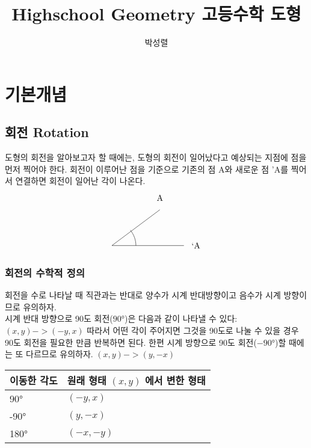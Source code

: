 \documentclass{article}
\title{Highschool Geometry 고등수학 도형}
\author{박성렬}
\begin{document}
\maketitle
\section{기본개념}
\subsection{회전 Rotation}
도형의 회전을 알아보고자 할 때에는, 도형의 회전이 일어났다고 예상되는 지점에 점을 먼저 찍어야 한다. 회전이 이루어난 점을 기준으로 기존의 점 A와 새로운 점 'A를 찍어서 연결하면 회전이 일어난 각이 나온다.\\
$$
\begin{tikzpicture}

\draw (1,3) -- (-1,1.5) -- (2,1.5);
\node at (1,3.5) {\\A};
\node at (-1,1.5) {};
\node at (2.5,1.5) {\\`A};
\draw (-0.234,2.1428) arc (40.0022:0:1);
\end{tikzpicture}
$$
\subsubsection{회전의 수학적 정의}
회전을 수로 나타날 때 직관과는 반대로 양수가 시계 반대방향이고 음수가 시계 방향이므로 유의하자.\\
시계 반대 방향으로 90도 회전($\ang{+90}$)은 다음과 같이 나타낼 수 있다:  $(x, y) ->(-y,x)$ 따라서 어떤 각이 주어지면 그것을 90도로 나눌 수 있을 경우 90도 회전을 필요한 만큼 반복하면 된다.
한편 시계 방향으로 90도 회전($\ang{-90}$)할 때에는 또 다르므로 유의하자. $(x, y) -> (y,-x)$\\

\begin{tabular} {| l | l |}
\hline
이동한 각도 & 원래 형태 $(x,y)$ 에서 변한 형태\\
\hline
\ang{+90} & $(-y,x)$\\
\hline
\ang{-90} & $(y,-x)$\\
\hline
\ang{+180} & $(-x,-y)$\\
\hline
\end{tabular}
\end{document}
